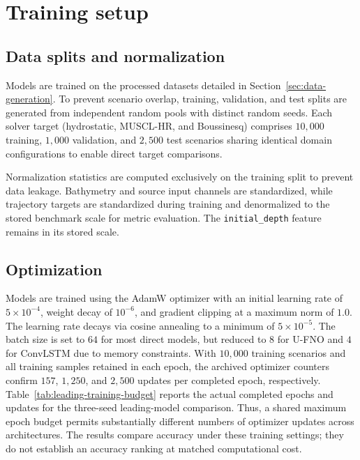 \section{Training setup}
\label{sec:training}

\subsection{Data splits and normalization}
\label{subsec:train-splits}
Models are trained on the processed datasets detailed in Section~\ref{sec:data-generation}. To prevent scenario overlap, training, validation, and test splits are generated from independent random pools with distinct random seeds. Each solver target (hydrostatic, MUSCL-HR, and Boussinesq) comprises $10{,}000$ training, $1{,}000$ validation, and $2{,}500$ test scenarios sharing identical domain configurations to enable direct target comparisons.

Normalization statistics are computed exclusively on the training split to prevent data leakage. Bathymetry and source input channels are standardized, while trajectory targets are standardized during training and denormalized to the stored benchmark scale for metric evaluation. The \texttt{initial\_depth} feature remains in its stored scale.
\subsection{Optimization}
\label{subsec:train-optim}
Models are trained using the AdamW optimizer with an initial learning rate of $5 \times 10^{-4}$, weight decay of $10^{-6}$, and gradient clipping at a maximum norm of $1.0$. The learning rate decays via cosine annealing to a minimum of $5 \times 10^{-5}$. The batch size is set to $64$ for most direct models, but reduced to $8$ for U-FNO and $4$ for ConvLSTM due to memory constraints. With $10{,}000$ training scenarios and all training samples retained in each epoch, the archived optimizer counters confirm $157$, $1{,}250$, and $2{,}500$ updates per completed epoch, respectively. Table~\ref{tab:leading-training-budget} reports the actual completed epochs and updates for the three-seed leading-model comparison. Thus, a shared maximum epoch budget permits substantially different numbers of optimizer updates across architectures. The results compare accuracy under these training settings; they do not establish an accuracy ranking at matched computational cost.

